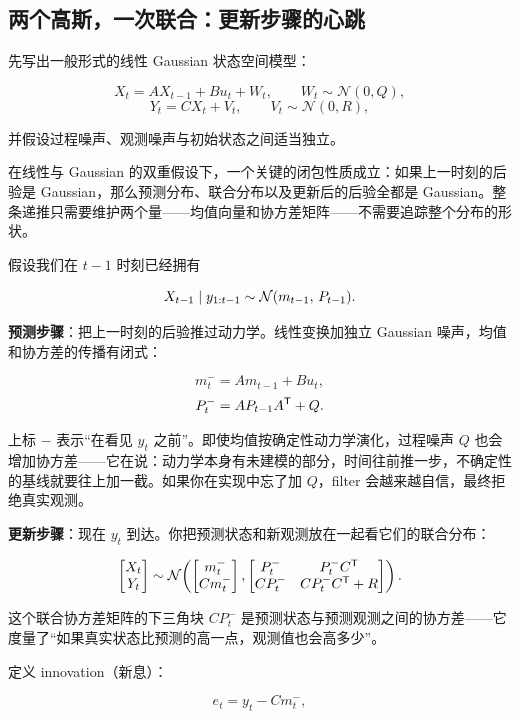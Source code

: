 \subsection{两个高斯，一次联合：更新步骤的心跳}

先写出一般形式的线性 Gaussian 状态空间模型：

\[
X_t = A X_{t-1} + B u_t + W_t,\qquad W_t \sim \mathcal{N}(0, Q),
\]
\[
Y_t = C X_t + V_t,\qquad V_t \sim \mathcal{N}(0, R),
\]

并假设过程噪声、观测噪声与初始状态之间适当独立。

在线性与 Gaussian 的双重假设下，一个关键的闭包性质成立：如果上一时刻的后验是 Gaussian，那么预测分布、联合分布以及更新后的后验全都是 Gaussian。整条递推只需要维护两个量——均值向量和协方差矩阵——不需要追踪整个分布的形状。

假设我们在 \(t-1\) 时刻已经拥有

\[
X_{t-1} \mid y_{1:t-1} \sim \mathcal{N}(m_{t-1},\, P_{t-1}).
\]

\textbf{预测步骤}：把上一时刻的后验推过动力学。线性变换加独立 Gaussian 噪声，均值和协方差的传播有闭式：

\[
m_t^- = A m_{t-1} + B u_t,
\]
\[
P_t^- = A P_{t-1} A^{\mathsf{T}} + Q.
\]

上标 \(-\) 表示``在看见 \(y_t\) 之前''。即使均值按确定性动力学演化，过程噪声 \(Q\) 也会增加协方差——它在说：动力学本身有未建模的部分，时间往前推一步，不确定性的基线就要往上加一截。如果你在实现中忘了加 \(Q\)，filter 会越来越自信，最终拒绝真实观测。

\textbf{更新步骤}：现在 \(y_t\) 到达。你把预测状态和新观测放在一起看它们的联合分布：

\[
\begin{bmatrix}
X_t \\ Y_t
\end{bmatrix}
\sim
\mathcal{N}\!\left(
\begin{bmatrix}
m_t^- \\ C m_t^-
\end{bmatrix},
\begin{bmatrix}
P_t^- & P_t^- C^{\mathsf{T}} \\
C P_t^- & C P_t^- C^{\mathsf{T}} + R
\end{bmatrix}
\right).
\]

这个联合协方差矩阵的下三角块 \(C P_t^-\) 是预测状态与预测观测之间的协方差——它度量了``如果真实状态比预测的高一点，观测值也会高多少''。

定义 innovation（新息）：

\[
e_t = y_t - C m_t^-,
\]

